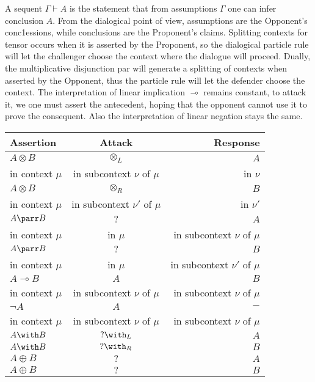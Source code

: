 \documentclass{article}
\begin{document}
A sequent $\Gamma \vdash A$ is the statement that from assumptions
$\Gamma$ one can infer conclusion $A$. From the dialogical point of
view, assumptions are the Opponent's conc1essions, while conclusions
are the Proponent's claims. Splitting contexts for tensor occurs when
it is asserted by the Proponent, so the dialogical particle rule will
let the challenger choose the context where the dialogue will
proceed. Dually, the multiplicative disjunction par will generate a
splitting of contexts when asserted by the Opponent, thus the particle
rule will let the defender choose the context. The interpretation of
linear implication $\multimap$ remains constant, to attack it, we one
must assert the antecedent, hoping that the opponent cannot use it to
prove the consequent. Also the interpretation of linear negation stays
the same.

\begin{center}
  \begin{tabular}{| l | c || r |}
    \hline
  Assertion & Attack  & Response \\ \hline
  $ A\otimes B$& $\otimes_{L}$& $A$   \\ 
   in context $\mu$ & in subcontext $\nu$ of $\mu$ &in $\nu$ \\  \hline
   $A\otimes B$  & $\otimes_{R}$ & $B$ \\ 
      in context $\mu$ & in subcontext $\nu'$ of $\mu$ &in $\nu'$ \\  \hline
    $ A\parr B$ & $?$ & $A$  \\ 
       in context $\mu$ &in $\mu$  &in subcontext $\nu$ of $\mu$ \\  \hline
     $ A\parr B$ & $?$ & $B$ \\ 
           in context $\mu$ &in $\mu$  &in subcontext $\nu'$ of $\mu$ \\\hline
    $ A\multimap B$ & $A$ & $B$ \\ 
          in context $\mu$ & in subcontext $\nu$ of $\mu$ & in subcontext $\nu$ of $\mu$\\ \hline
     $ \neg A$ & $A$ & $-$ \\ 
       in context $\mu$ & in subcontext $\nu$ of $\mu$ & in subcontext $\nu$ of $\mu$\\ \hline
    $ A\with B$& $?\with_{L}$& $A$   \\   
      $ A\with B$& $?\with_{R}$& $B$   \\ \hline
        $ A\oplus B$& $?$& $A$   \\   
          $ A\oplus B$& $?$& $B$   \\    
    \hline
  \end{tabular}
\end{center}
\end{document}
